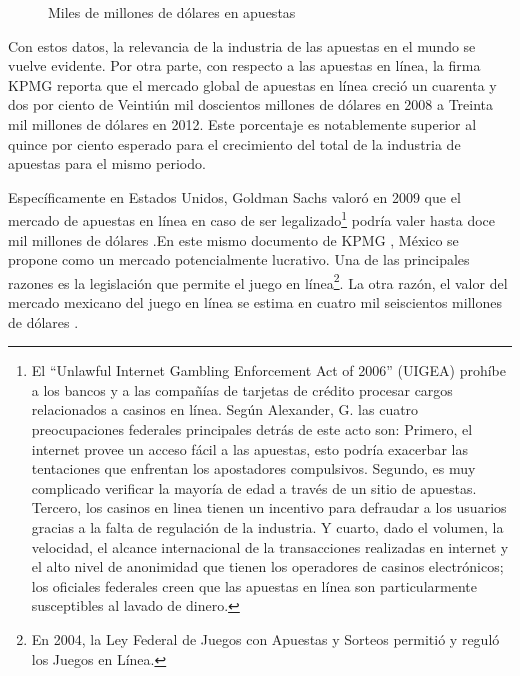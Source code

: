 \begin{figure}[!htb]\centering
   \begin {minipage}{0.85\textwidth}
     \caption{Miles de millones de dólares en apuestas}\label{Fig:gasto-apuestas}
   \end{minipage}
\end{figure}

Con estos datos, la relevancia de la industria de las apuestas en el mundo se vuelve evidente.  Por otra parte, con respecto a las apuestas en línea, la firma KPMG \cite{kpmgOnlineGaming} reporta que el mercado global de apuestas en línea creció un cuarenta y dos por ciento de Veintiún mil doscientos millones de dólares en 2008 a Treinta mil millones de dólares en 2012. Este porcentaje es notablemente superior al quince por ciento esperado para el crecimiento del total de la industria de apuestas para el mismo periodo. 

Específicamente en Estados Unidos, Goldman Sachs valoró en 2009 que el mercado de apuestas en línea en caso de ser legalizado\footnote{El ``Unlawful Internet Gambling Enforcement Act of 2006'' (UIGEA)  prohíbe a los bancos y a las compañías de tarjetas de crédito procesar cargos relacionados a casinos en línea. Según Alexander, G. \cite{alexander2008us} las cuatro preocupaciones federales principales detrás de este acto son: Primero, el internet provee un acceso fácil a las apuestas, esto podría exacerbar las tentaciones que enfrentan los apostadores compulsivos. Segundo, es muy complicado verificar la mayoría de edad a través de un sitio de apuestas. Tercero, los casinos en linea tienen un incentivo para defraudar a los usuarios gracias a la falta de regulación de la industria. Y cuarto, dado el volumen, la velocidad, el alcance internacional de la transacciones realizadas en internet y el alto nivel de anonimidad que tienen los operadores de casinos electrónicos; los oficiales federales creen que las apuestas en línea son particularmente susceptibles al lavado de dinero.} podría valer hasta doce mil millones de dólares \cite{goldmanParty}.En este mismo documento de KPMG \cite{kpmgOnlineGaming}, México se propone como un mercado potencialmente lucrativo. Una de las principales razones es la legislación que permite el juego en línea\footnote{En 2004, la Ley Federal de Juegos con Apuestas y Sorteos permitió y reguló los Juegos en Línea.}. La otra razón, el valor del mercado mexicano del juego en línea se estima en cuatro mil seiscientos millones de dólares \cite{yogonet}.

